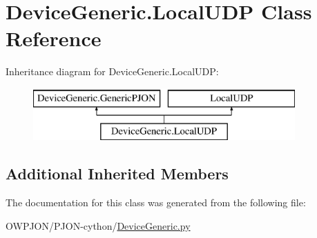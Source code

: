 \hypertarget{classDeviceGeneric_1_1LocalUDP}{\section{Device\-Generic.\-Local\-U\-D\-P Class Reference}
\label{classDeviceGeneric_1_1LocalUDP}
}
Inheritance diagram for Device\-Generic.\-Local\-U\-D\-P\-:\begin{figure}[H]
\begin{center}
\leavevmode
\includegraphics[height=2.000000cm]{classDeviceGeneric_1_1LocalUDP}
\end{center}
\end{figure}
\subsection*{Additional Inherited Members}


The documentation for this class was generated from the following file\-:\begin{DoxyCompactItemize}
\item 
O\-W\-P\-J\-O\-N/\-P\-J\-O\-N-\/cython/\hyperlink{DeviceGeneric_8py}{Device\-Generic.\-py}\end{DoxyCompactItemize}
